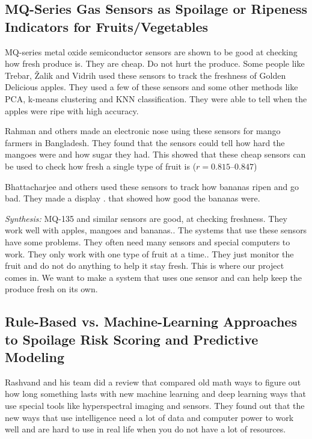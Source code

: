 \documentclass[conference]{IEEEtran}
\begin{document}
\subsection{MQ-Series Gas Sensors as Spoilage or Ripeness Indicators for Fruits/Vegetables}

MQ-series metal oxide semiconductor sensors are shown to be good at checking how fresh produce is. They are cheap. Do not hurt the produce. Some people like Trebar, Žalik and Vidrih used these sensors to track the freshness of Golden Delicious apples. They used a few of these sensors and some other methods like PCA, k-means clustering and KNN classification. They were able to tell when the apples were ripe with high accuracy.\cite{trebar2024}

Rahman and others made an electronic nose using these sensors for mango farmers in Bangladesh. They found that the sensors could tell how hard the mangoes were and how sugar they had. This showed that these cheap sensors can be used to check how fresh a single type of fruit is ($r = 0.815$--$0.847$)
\cite{rahman2024}

Bhattacharjee and others used these sensors to track how bananas ripen and go bad. They made a display \cite{bhattacharjee2025}. that showed how good the bananas were.

\textit{Synthesis:} MQ-135 and similar sensors are good, at checking freshness. They work well with apples, mangoes and bananas.. The systems that use these sensors have some problems. They often need many sensors and special computers to work. They only work with one type of fruit at a time.. They just monitor the fruit and do not do anything to help it stay fresh. This is where our project comes in. We want to make a system that uses one sensor\cite{trebar2024} and can help keep the produce fresh on its own.

\subsection{Rule-Based vs. Machine-Learning Approaches to Spoilage Risk Scoring and Predictive Modeling}

Rashvand and his team did a review that compared old math ways to figure out how long something lasts with new machine learning and deep learning ways that use special tools like hyperspectral imaging and sensors. They found out that the new ways that use intelligence need a lot of data and computer power to work well and are hard to use in real life when you do not have a lot of resources.\cite{rashvand2025}
\end{document}
